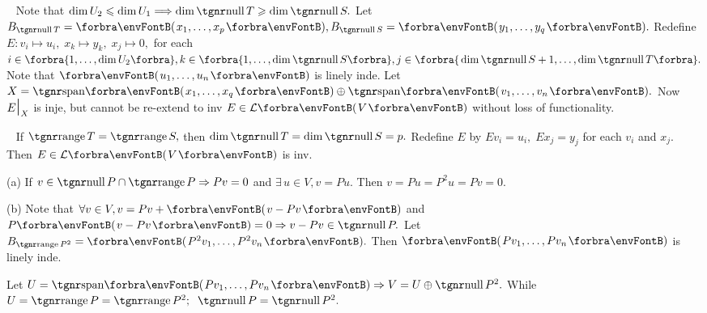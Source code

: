 \Comment \,\,\, \;Note that $\dim U_2\leqslant\dim U_1\Longrightarrow\dim\null T\geqslant\dim\null S.$\parCom\quad
Let $B_{\null T}=\Par{x_1,\dots,x_p},B_{\null S}=\Par{y_1,\dots,y_q}.$ Redefine $E:v_i\mapsto u_i,\;x_k\mapsto y_k,\;x_j\mapsto 0,$\parCom\quad
for each $i\in\Bra{1,\dots,\dim U_2},k\in\Bra{1,\dots,\dim\null S},j\in\Bra{\dim\null S+1,\dots,\dim\null T}.$\parCom\quad
Note that $\Par{u_1,\dots,u_n}$ is linely inde. Let $X=\Span{x_1,\dots,x_q}\oplus\Span{v_1,\dots,v_n}.$\parCom\quad
Now $E\text{\Large|}_X$ is inje, but cannot be re-extend to inv $E\in\Lm{V}$ without loss of functionality.\par\vspace{4pt}\quad
\Corollary \,\,\, \;If $\range T=\range S,$ then $\dim\null T=\dim\null S=p.$\parCor\quad
Redefine $E$ by $Ev_i=u_i,\;Ex_j=y_j$ for each $v_i$ and $x_j.$ Then $E\in\Lm{V}$ is inv.\PfEnd
\SepLine

\par\quad
(a) If $v\in\null P\cap\range P\Rightarrow Pv=0$ and $\exists\,u\in V,v=Pu.$ Then $v=Pu=P^2 u=Pv=0.$\par\quad
(b) Note that $\forall v\in V,v=Pv+\Par{v-Pv}$ and $P\Par{v-Pv}=0\Rightarrow v-Pv\in\null P.$\PfEnd\vspace{4pt}\quad
\Or {} \;Let $B_{\range P^2}=\Par{P^2 v_1,\dots,P^2 v_n}.$ Then $\Par{Pv_1,\dots,Pv_n}$ is linely inde.\par\quad
Let $U=\Span{Pv_1,\dots,Pv_n}\Rightarrow V=U\oplus\null P^2.$ \;While $U=\range P=\range P^2;\;\;\null P=\null P^2.$\PfEnd
\SepLine
\ChEnd

\vfill{}
\vspace{8pt}


